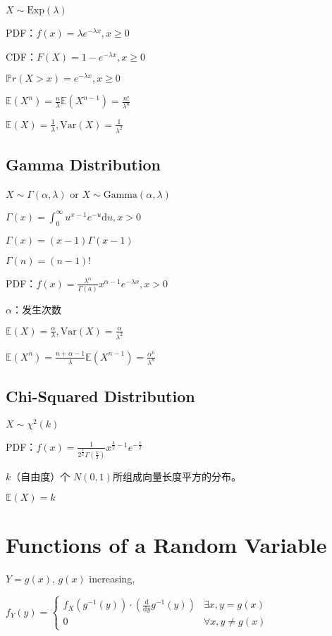 \documentclass[9pt,landscape]{article}
\begin{document}
\begin{multicols}{3}
$X\sim \mathrm{Exp}(\lambda)$

PDF：$f(x)=\lambda e^{-\lambda x}, x\ge 0$

CDF：$F(X)=1-e^{-\lambda x}, x\ge 0$

$\mathbb{P}r(X>x)=e^{-\lambda x}, x\ge 0$

$\mathbb{E}(X^n)=\frac{n}{\lambda}\mathbb{E}(X^{n-1})=\frac{n!}{\lambda^n}$

$\mathbb{E}(X)=\frac{1}{\lambda}, \mathrm{Var}(X)=\frac{1}{\lambda^2}$

\subsection{Gamma Distribution}

$X\sim \Gamma(\alpha, \lambda)$ or $X\sim \mathrm{Gamma}(\alpha, \lambda)$

$\Gamma(x)=\int_{0}^{\infty}u^{x-1}e^{-u}\mathrm{d}u, x>0$

$\Gamma(x)=(x-1)\Gamma(x - 1)$

$\Gamma(n)=(n-1)!$

PDF：$f(x)=\frac{\lambda^\alpha}{\Gamma(a)}x^{\alpha - 1}e^{-\lambda x}, x>0$

$\alpha$：发生次数

$\mathbb{E}(X)=\frac{\alpha}{\lambda}, \mathrm{Var}(X)=\frac{\alpha}{\lambda^2}$

$\mathbb{E}(X^n)=\frac{n+\alpha-1}{\lambda}\mathbb{E}(X^{n-1})=\frac{\alpha^{\overline{n}}}{\lambda^n}$

\subsection{Chi-Squared Distribution}

$X\sim \chi^2(k)$

PDF：$f(x)=\frac{1}{2^{\frac{k}{2}}\Gamma\left(\frac{k}{2}\right)}x^{\frac{k}{2}-1}e^{-\frac{x}{2}}$

$k$（自由度）个 $N(0, 1)$所组成向量长度平方的分布。

$\mathbb{E}(X)=k$

\section{Functions of a Random Variable}
$Y=g(x)$, $g(x)$ increasing,

$f_Y(y)=\begin{cases}
	f_X\left(g^{-1}(y)\right)\cdot\left(\frac{\mathrm{d}}{\mathrm{d}y}g^{-1}(y)\right) & \exists x, y=g(x)\\
	0 & \forall x, y\neq g(x)
\end{cases}$


\end{multicols}
\end{document}
